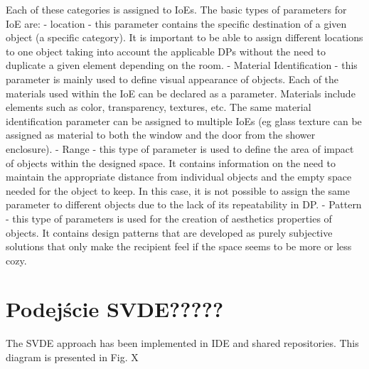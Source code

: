 \documentclass[runningheads]{llncs}
\begin{document}
Each of these categories is assigned to IoEs. The basic types of parameters for IoE are:
- location - this parameter contains the specific destination of a given object (a specific category). It is important to be able to assign different locations to one object taking into account the applicable DPs without the need to duplicate a given element depending on the room.
- Material Identification - this parameter is mainly used to define visual appearance of objects. Each of the materials used within the IoE can be declared as a parameter. Materials include elements such as color, transparency, textures, etc. The same material identification parameter can be assigned to multiple IoEs (eg glass texture can be assigned as material to both the window and the door from the shower enclosure).
- Range - this type of parameter is used to define the area of impact of objects within the designed space. It contains information on the need to maintain the appropriate distance from individual objects and the empty space needed for the object to keep. In this case, it is not possible to assign the same parameter to different objects due to the lack of its repeatability in DP.
- Pattern - this type of parameters is used for the creation of aesthetics properties of objects. It contains design patterns that are developed as purely subjective solutions that only make the recipient feel if the space seems to be more or less cozy. 


\section{Podejście SVDE?????}
The SVDE approach has been implemented in IDE and shared repositories. This diagram is presented in Fig. X
\end{document}
